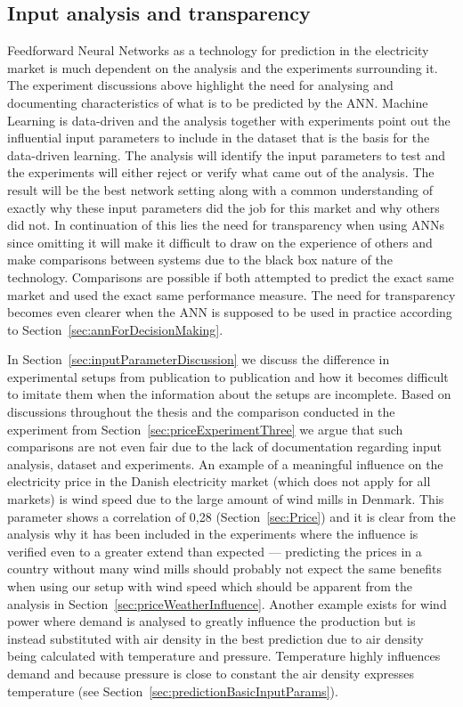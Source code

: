 \subsection{Input analysis and transparency}
Feedforward Neural Networks as a technology for prediction in the electricity market is much dependent on the analysis and the experiments surrounding it. The experiment discussions above highlight the need for analysing and documenting characteristics of what is to be predicted by the ANN. Machine Learning is data-driven\cite{18} and the analysis together with experiments point out the influential input parameters to include in the dataset that is the basis for the data-driven learning. The analysis will identify the input parameters to test and the experiments will either reject or verify what came out of the analysis. The result will be the best network setting along with a common understanding of exactly why these input parameters did the job for this market and why others did not. In continuation of this lies the need for transparency when using ANNs since omitting it will make it difficult to draw on the experience of others and make comparisons between systems due to the black box nature of the technology. Comparisons are possible if both attempted to predict the exact same market and used the exact same performance measure. The need for transparency becomes even clearer when the ANN is supposed to be used in practice according to Section~\ref{sec:annForDecisionMaking}. 

In Section~\ref{sec:inputParameterDiscussion} we discuss the difference in experimental setups from publication to publication and how it becomes difficult to imitate them when the information about the setups are incomplete. Based on discussions throughout the thesis and the comparison conducted in the experiment from Section~\ref{sec:priceExperimentThree} we argue that such comparisons are not even fair due to the lack of documentation regarding input analysis, dataset and experiments. An example of a meaningful influence on the electricity price in the Danish electricity market (which does not apply for all markets) is wind speed due to the large amount of wind mills in Denmark. This parameter shows a correlation of 0,28 (Section~\ref{sec:Price}) and it is clear from the analysis why it has been included in the experiments where the influence is verified even to a greater extend than expected --- predicting the prices in a country without many wind mills should probably not expect the same benefits when using our setup with wind speed which should be apparent from the analysis in Section~\ref{sec:priceWeatherInfluence}. Another example exists for wind power where demand is analysed to greatly influence the production but is instead substituted with air density in the best prediction due to air density being calculated with temperature and pressure. Temperature highly influences demand and because pressure is close to constant the air density expresses temperature (see Section~\ref{sec:predictionBasicInputParams}). 

